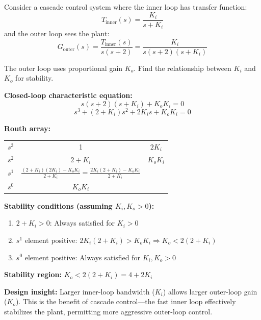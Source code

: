 \begin{example}
\label{ex:cascade_stability}
Consider a cascade control system where the inner loop has transfer function:
\begin{equation}
T_{\text{inner}}(s) = \frac{K_i}{s + K_i}
\end{equation}
and the outer loop sees the plant:
\begin{equation}
G_{\text{outer}}(s) = \frac{T_{\text{inner}}(s)}{s(s+2)} = \frac{K_i}{s(s+2)(s+K_i)}
\end{equation}

The outer loop uses proportional gain $K_o$. Find the relationship between $K_i$ and $K_o$ for stability.

\textbf{Closed-loop characteristic equation:}
\begin{equation}
s(s+2)(s+K_i) + K_o K_i = 0
\end{equation}
\begin{equation}
s^3 + (2+K_i)s^2 + 2K_i s + K_o K_i = 0
\end{equation}

\textbf{Routh array:}
\begin{center}
\begin{tabular}{c|cc}
$s^3$ & 1 & $2K_i$ \\
$s^2$ & $2+K_i$ & $K_o K_i$ \\
$s^1$ & $\frac{(2+K_i)(2K_i) - K_o K_i}{2+K_i} = \frac{2K_i(2+K_i) - K_o K_i}{2+K_i}$ & \\
$s^0$ & $K_o K_i$ &
\end{tabular}
\end{center}

\textbf{Stability conditions (assuming $K_i, K_o > 0$):}
\begin{enumerate}
    \item $2 + K_i > 0$: Always satisfied for $K_i > 0$
    \item $s^1$ element positive: $2K_i(2+K_i) > K_o K_i \Rightarrow K_o < 2(2+K_i)$
    \item $s^0$ element positive: Always satisfied for $K_i, K_o > 0$
\end{enumerate}

\textbf{Stability region:} $K_o < 2(2 + K_i) = 4 + 2K_i$

\textbf{Design insight:} Larger inner-loop bandwidth ($K_i$) allows larger outer-loop gain ($K_o$). This is the benefit of cascade control---the fast inner loop effectively stabilizes the plant, permitting more aggressive outer-loop control.
\end{example}

